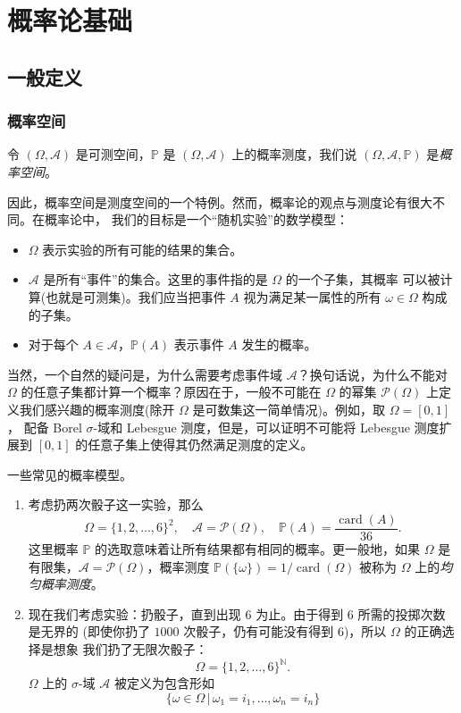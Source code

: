 \documentclass[fontset=none]{Notes}
\DeclareMathOperator\card{card}
\begin{document}
\chapter{概率论基础}

\section{一般定义}

\subsection{概率空间}

令 $(\Omega,\mathcal{A})$ 是可测空间，$\mathbb{P}$ 是 $(\Omega,\mathcal{A})$
上的概率测度，我们说 $(\Omega,\mathcal{A},\mathbb{P})$ 是\emph{概率空间}。

因此，概率空间是测度空间的一个特例。然而，概率论的观点与测度论有很大不同。在概率论中，
我们的目标是一个“随机实验”的数学模型：
\begin{itemize}[nosep]
  \item $\Omega$ 表示实验的所有可能的结果的集合。
  \item $\mathcal{A}$ 是所有“事件”的集合。这里的事件指的是 $\Omega$ 的一个子集，其概率
  可以被计算(也就是可测集)。我们应当把事件 $A$ 视为满足某一属性的所有 $\omega\in\Omega$ 
  构成的子集。
  \item 对于每个 $A\in \mathcal{A}$，$\mathbb{P}(A)$ 表示事件 $A$ 发生的概率。
\end{itemize}

当然，一个自然的疑问是，为什么需要考虑事件域 $\mathcal{A}$？换句话说，为什么不能对
$\Omega$ 的任意子集都计算一个概率？原因在于，一般不可能在 $\Omega$ 的幂集 $\mathcal{P}(\Omega)$
上定义我们感兴趣的概率测度(除开 $\Omega$ 是可数集这一简单情况)。例如，取 $\Omega=[0,1]$，
配备 Borel $\sigma$-域和 Lebesgue 测度，但是，可以证明不可能将 Lebesgue 测度扩展到
$[0,1]$ 的任意子集上使得其仍然满足测度的定义。

\begin{example}\label{exa:dice model}
  一些常见的概率模型。
  \begin{enumerate}
    \item 考虑扔两次骰子这一实验，那么
    \[
      \Omega=\{1,2,\dots,6\}^2,\quad \mathcal{A}=\mathcal{P}(\Omega),\quad
      \mathbb{P}(A)=\frac{\card(A)}{36}.
    \]
    这里概率 $\mathbb{P}$ 的选取意味着让所有结果都有相同的概率。更一般地，如果 $\Omega$
    是有限集，$\mathcal{A}=\mathcal{P}(\Omega)$，概率测度 $\mathbb{P}(\{\omega\})=1/\card(\Omega)$
    被称为 $\Omega$ 上的\emph{均匀概率测度}。
    \item 现在我们考虑实验：扔骰子，直到出现 $6$ 为止。由于得到 $6$ 所需的投掷次数是无界的
    (即使你扔了 $1000$ 次骰子，仍有可能没有得到 $6$)，所以 $\Omega$ 的正确选择是想象
    我们扔了无限次骰子：
    \[
      \Omega=\{1,2,\dots,6\}^{\mathbb{N}}.
    \]
    $\Omega$ 上的 $\sigma$-域 $\mathcal{A}$ 被定义为包含形如
    \[
      \{\omega\in\Omega\,|\, \omega_1=i_1,\dots,\omega_n=i_n\}
    \]
  \end{enumerate}
\end{example}
\end{document}
